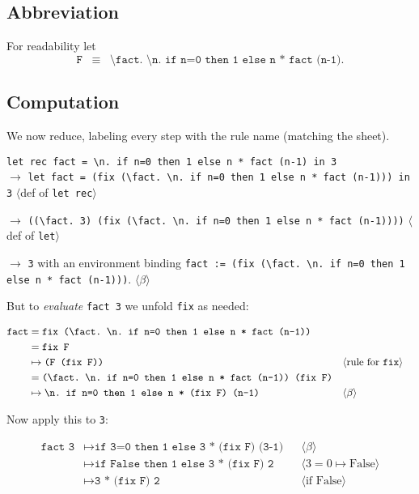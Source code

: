 \documentclass[11pt]{article}
\begin{document}
\subsection*{Abbreviation}
For readability let
\[
\texttt{F} \;\; \equiv \;\; \texttt{\textbackslash fact.\ \textbackslash n.\ if n=0 then 1 else n * fact (n-1)}.
\]

\subsection*{Computation}
We now reduce, labeling every step with the rule name (matching the sheet).

\medskip
\noindent
\texttt{let rec fact = \textbackslash n. if n=0 then 1 else n * fact (n-1) in 3}\\
\(\to\) \texttt{let fact = (fix (\textbackslash fact.\ \textbackslash n.\ if n=0 then 1 else n * fact (n-1))) in 3}
\hfill \(\langle\)def of \texttt{let rec}\(\rangle\)

\medskip
\noindent
\(\to\) \texttt{((\textbackslash fact.\ 3)\ (fix (\textbackslash fact.\ \textbackslash n.\ if n=0 then 1 else n * fact (n-1))))}
\hfill \(\langle\)def of \texttt{let}\(\rangle\)

\medskip
\noindent
\(\to\) \texttt{3} \quad with an environment binding
\texttt{fact := (fix (\textbackslash fact.\ \textbackslash n.\ if n=0 then 1 else n * fact (n-1)))}.
\hfill \(\langle\beta\rangle\)

\medskip

But to \emph{evaluate} \texttt{fact 3} we unfold \texttt{fix} as needed:

\begin{align*}
\texttt{fact} &= \texttt{fix (\textbackslash fact.\ \textbackslash n.\ if n=0 then 1 else n * fact (n-1))}\\
&= \texttt{fix F} \\
&\mapsto \texttt{(F (fix F))} && \langle\text{rule for \texttt{fix}}\rangle\\
&= \texttt{(\textbackslash fact.\ \textbackslash n.\ if n=0 then 1 else n * fact (n-1)) (fix F)}\\
&\mapsto \texttt{\textbackslash n.\ if n=0 then 1 else n * (fix F)\ (n-1)} && \langle\beta\rangle
\end{align*}

Now apply this to \texttt{3}:

\begin{align*}
\texttt{fact 3}
&\mapsto \texttt{if 3=0 then 1 else 3 * (fix F)\ (3-1)} && \langle\beta\rangle\\
&\mapsto \texttt{if False then 1 else 3 * (fix F)\ 2} && \langle 3=0 \mapsto \text{False}\rangle\\
&\mapsto \texttt{3 * (fix F)\ 2} && \langle \text{if False}\rangle
\end{align*}
\end{document}
